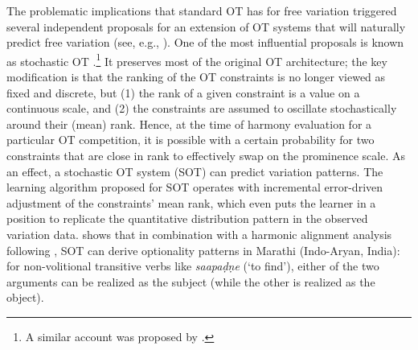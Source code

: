 \documentclass[output=paper,hidelinks]{langscibook}
\begin{document}
The problematic implications that standard OT has for free variation triggered several independent proposals for an extension of OT systems that will naturally predict free variation (see, e.g., \citealt{muller2014optionality,Asudeh01}). 
One of the most influential proposals is known as stochastic OT \citep{Boersma1998,BoersmaHayes2001}.\footnote{A similar account was proposed by \citet{Anttila97}.} %
It preserves most of the original OT architecture; the key modification is that the ranking of the OT constraints is no longer viewed as fixed and discrete, but (1) the rank of a given constraint is a value on a continuous scale, and (2) the constraints are assumed to oscillate stochastically around their (mean) rank. Hence, at the time of harmony evaluation for a particular OT competition, it is possible with a certain probability for two constraints that are close in rank to effectively swap on the prominence scale. As an effect, a stochastic OT system (SOT) can predict variation patterns. The learning algorithm proposed for SOT operates with incremental error-driven adjustment of the constraints' mean rank, which even puts the learner in a position to replicate the quantitative distribution pattern in the observed variation data. \citet{Asudeh01} shows that in combination with a harmonic alignment analysis following \citet{Aissen1999}, SOT can derive optionality patterns in Marathi (Indo-Aryan, India):
 for non-volitional transitive verbs like \emph{saapa\d{d}\d{n}e} (`to find'), either of the two arguments can be realized as the subject (while the other is realized as the object).%
 

\end{document}
